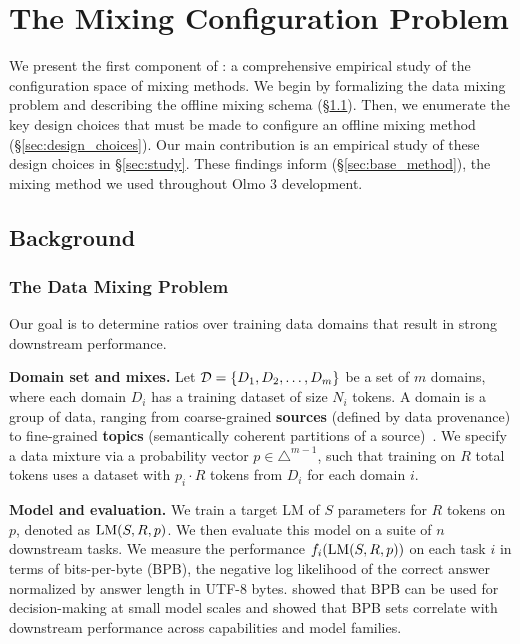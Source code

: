 \section{The Mixing Configuration Problem}
\label{sec:config-choices}

We present the first component of \olmix: a comprehensive empirical study of the configuration space of mixing methods. We begin by formalizing the data mixing problem and describing the offline mixing schema (\S\ref{sec:background}). Then, we enumerate the key design choices that must be made to configure an offline mixing method (\S\ref{sec:design_choices}).
Our main contribution is an empirical study of these design choices in \S\ref{sec:study}. 
These findings inform \base (\S\ref{sec:base_method}), the mixing method we used throughout Olmo 3 development.


\subsection{Background}\label{sec:background}

\subsubsection{The Data Mixing Problem}\label{sec:setup_1}

Our goal is to determine ratios over training data domains that result in strong downstream performance.


\textbf{Domain set and mixes.} Let $\mathcal{D} = \{D_1, D_2, \dots, D_m \}$ be a set of $m$ domains, where each domain $D_i$ has a training dataset of size $N_i$ tokens. A domain is a group of data, ranging from coarse-grained \textbf{sources} (defined by data provenance) to fine-grained \textbf{topics} (semantically coherent partitions of a source)~\citep{wettig2025organizewebconstructingdomains}.
We specify a data mixture via a probability vector $p \in \triangle^{m-1}$, such that training on $R$ total tokens uses a dataset with $p_i \cdot R$ tokens from $D_i$ for each domain $i$.




\textbf{Model and evaluation.} We train a target LM of $S$ parameters for $R$ tokens on $p$, denoted as $\text{LM}(S, R, p)$.
We then evaluate this model on a suite of $n$ downstream tasks. 
We measure the performance $f_i(\text{LM}(S, R, p))$ on each task $i$ in terms of bits-per-byte (BPB), the negative log likelihood of the correct answer normalized by answer length in UTF-8 bytes. \citet{heineman2025signalnoiseframeworkreducing} showed that BPB can be used for decision-making at small model scales and \citet{huang2024compression} showed that BPB sets correlate with downstream performance across capabilities and model families.


